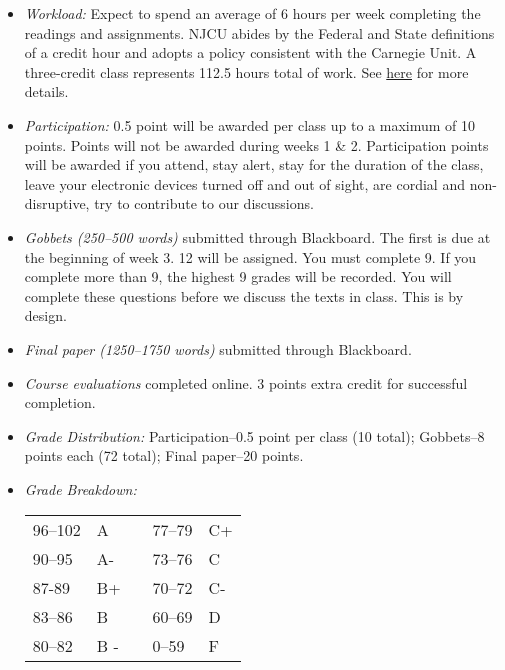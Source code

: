 \documentclass[article,oneside]{memoir}
\begin{document}
\begin{itemize}
\item \textit{Workload:} Expect to spend an average of 6 hours per week completing the readings and assignments. NJCU abides by the Federal and State definitions of a credit hour and adopts a policy consistent with the Carnegie Unit. A three-credit class represents 112.5 hours total of work. See \href{http://scottoconnor.org/resources/Credit.pdf}{here} for more details.

\item \textit{Participation:} 0.5 point will be awarded per class up to a maximum of 10 points. Points will not be awarded during weeks 1 \& 2. Participation points will be awarded if you attend, stay alert, stay for the duration of the class, leave your electronic devices turned off and out of sight, are cordial and non-disruptive, try to contribute to our discussions. 


\item \textit{Gobbets (250--500 words)} submitted through Blackboard. The first is due at the beginning of week 3. 12 will be assigned. You must complete 9. If you complete more than 9, the highest 9 grades will be recorded. You will complete these questions before we discuss the texts in class. This is by design. 



\item \textit{Final paper  (1250--1750 words) } submitted through Blackboard. 

\item \textit{Course evaluations} completed online. 3 points extra credit for successful completion.

\item \textit{Grade Distribution:} Participation--0.5 point per class (10 total); Gobbets--8 points each (72 total); Final paper--20 points. 

\item \textit{Grade Breakdown:}

 \begin{tabular}{ | l | l | p{2cm} | l | l | }
    \hline 
96--102 & A  & &  77--79 &  C+ \\  
90--95 & A- & &  73--76 & C \\
87-89 & B+ &  &  70--72 & C- \\ 
83--86 & B  & &  60--69 & D\\
80--82 & B - & & 0--59 & F\\ \hline
    \end{tabular}


\end{itemize}
\end{document}
